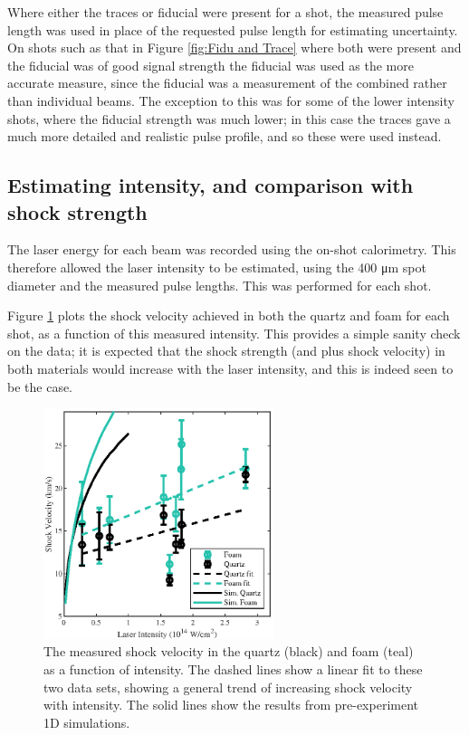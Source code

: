 Where either the traces or fiducial were present for a shot, the measured pulse length was used in place of the requested pulse length for estimating uncertainty. On shots such as that in Figure \ref{fig:Fidu and Trace} where both were present and the fiducial was of good signal strength the fiducial was used as the more accurate measure, since the fiducial was a measurement of the combined rather than individual beams. The exception to this was for some of the lower intensity shots, where the fiducial strength was much lower; in this case the traces gave a much more detailed and realistic pulse profile, and so these were used instead.

\subsection{Estimating intensity, and comparison with shock strength} \label{Intensity vs Shock Velocity}

The laser energy for each beam was recorded using the on-shot calorimetry. This therefore allowed the laser intensity to be estimated, using the 400 \unit{\micro\meter} spot diameter and the measured pulse lengths. This was performed for each shot.

Figure \ref{fig:Intensity} plots the shock velocity achieved in both the quartz and foam for each shot, as a function of this measured intensity. This provides a simple sanity check on the data; it is expected that the shock strength (and plus shock velocity) in both materials would increase with the laser intensity, and this is indeed seen to be the case.

\begin{figure} [h]
\begin{centering}
\includegraphics[width=0.6\textwidth]{figures/Experiment/Intensity.eps}%
\caption{\label{fig:Intensity} The measured shock velocity in the quartz (black) and foam (teal) as a function of intensity. The dashed lines show a linear fit to these two data sets, showing a general trend of increasing shock velocity with intensity. The solid lines show the results from pre-experiment 1D simulations.}
\end{centering}
\end{figure}

